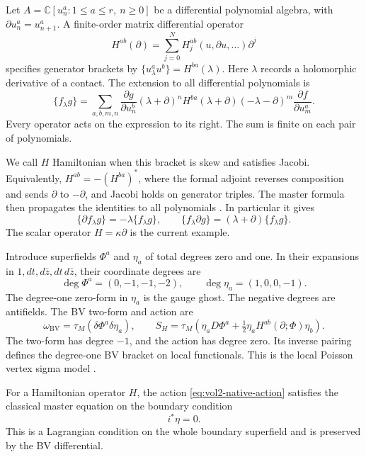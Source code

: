 Let \(A=\mathbb C[u^a_n:1\leq a\leq r,\ n\geq0]\) be a differential
polynomial algebra, with \(\partial u^a_n=u^a_{n+1}\).
A finite-order matrix differential operator
\[
 H^{ab}(\partial)=\sum_{j=0}^N H_j^{ab}(u,\partial u,\ldots)\partial^j
\]
specifies generator brackets by
\(\{u^a_\lambda u^b\}=H^{ba}(\lambda)\).
Here \(\lambda\) records a holomorphic derivative of a contact.
The extension to all differential polynomials is
\begin{equation}\label{eq:vol2-native-master-formula}
 \{f_\lambda g\}=
 \sum_{a,b,m,n}
 \frac{\partial g}{\partial u^b_n}(\lambda+\partial)^n
 H^{ba}(\lambda+\partial)(-\lambda-\partial)^m
 \frac{\partial f}{\partial u^a_m}.
\end{equation}
Every operator acts on the expression to its right. The sum is finite on
each pair of polynomials.

We call \(H\) Hamiltonian when this bracket is skew and satisfies Jacobi.
Equivalently, \(H^{ab}=-(H^{ba})^*\), where the formal adjoint reverses
composition and sends \(\partial\) to \(-\partial\), and Jacobi holds on
generator triples. The master formula then propagates the identities to
all polynomials \cite[Theorem 1.15 and Proposition 1.16]{BarakatDeSoleKac2009}.
In particular it gives
\[
 \{\partial f_\lambda g\}=-\lambda\{f_\lambda g\},\qquad
 \{f_\lambda\partial g\}=(\lambda+\partial)\{f_\lambda g\}.
\]
The scalar operator \(H=\kappa\partial\) is the current example.

Introduce superfields \(\Phi^a\) and \(\eta_a\) of total degrees zero
and one. In their expansions in \(1,dt,d\bar z,dt\,d\bar z\), their
coordinate degrees are
\[
 \deg\Phi^a=(0,-1,-1,-2),\qquad
 \deg\eta_a=(1,0,0,-1).
\]
The degree-one zero-form in \(\eta_a\) is the gauge ghost. The negative
degrees are antifields. The BV two-form and action are
\begin{equation}\label{eq:vol2-native-action}
 \omega_{\mathrm{BV}}=\tau_M(\delta\Phi^a\delta\eta_a),
 \qquad
 S_H=\tau_M\left(\eta_aD\Phi^a+
              \tfrac12\eta_aH^{ab}(\partial;\Phi)\eta_b\right).
\end{equation}
The two-form has degree \(-1\), and the action has degree zero.
Its inverse pairing defines the degree-one BV bracket on local
functionals. This is the local Poisson vertex sigma model
\cite[\S\S2.2 and 4.1]{KhanZeng2025}.

\begin{proposition}\label{prop:vol2-native-classical}
For a Hamiltonian operator \(H\), the action
\eqref{eq:vol2-native-action} satisfies the classical master equation
on the boundary condition
\[
                         i^*\eta=0.
\]
This is a Lagrangian condition on the whole boundary superfield and is
preserved by the BV differential.
\end{proposition}

